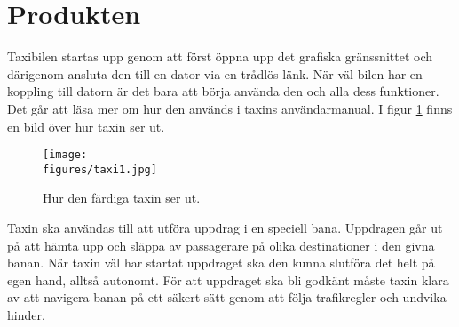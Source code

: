 \documentclass[tekniskrapport/tech.tex]{subfiles}
\begin{document}
\section{Produkten}
Taxibilen startas upp genom att först öppna upp det grafiska gränssnittet och
därigenom ansluta den till en dator via en trådlös länk. När väl bilen har en
koppling till datorn är det bara att börja använda den och alla dess
funktioner. Det går att läsa mer om hur den används i taxins användarmanual. I figur
\ref{fig:taxi1} finns en bild över hur taxin ser ut.

\begin{figure}[H]
    \centering
    \texttt{[image: \\figures/taxi1.jpg]}
    \caption{Hur den färdiga taxin ser ut.}
    \label{fig:taxi1}
\end{figure}

\noindent
Taxin ska användas till att utföra uppdrag i en speciell bana. Uppdragen går ut
på att hämta upp och släppa av passagerare på olika destinationer i den givna
banan. När taxin väl har startat uppdraget ska den kunna slutföra det helt på
egen hand, alltså autonomt. För att uppdraget ska bli godkänt måste taxin klara
av att navigera banan på ett säkert sätt genom att följa trafikregler och
undvika hinder.
\end{document}
